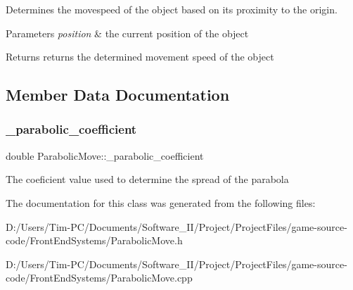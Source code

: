 Determines the movespeed of the object based on its proximity to the origin. 


\begin{DoxyParams}{Parameters}
{\em position} & the current position of the object \\
\hline
\end{DoxyParams}
\begin{DoxyReturn}{Returns}
returns the determined movement speed of the object 
\end{DoxyReturn}


\subsection{Member Data Documentation}
\mbox{\label{class_parabolic_move_a4ae7c298df76cb1a0f5f7d6f85c0977c}} 
\subsubsection{\texorpdfstring{\+\_\+parabolic\+\_\+coefficient}{\_parabolic\_coefficient}}
{\footnotesize\ttfamily double Parabolic\+Move\+::\+\_\+parabolic\+\_\+coefficient\hspace{0.3cm}{\ttfamily [private]}}

The coeficient value used to determine the spread of the parabola 

The documentation for this class was generated from the following files\+:\begin{DoxyCompactItemize}
\item 
D\+:/\+Users/\+Tim-\/\+P\+C/\+Documents/\+Software\+\_\+\+I\+I/\+Project/\+Project\+Files/game-\/source-\/code/\+Front\+End\+Systems/Parabolic\+Move.\+h\item 
D\+:/\+Users/\+Tim-\/\+P\+C/\+Documents/\+Software\+\_\+\+I\+I/\+Project/\+Project\+Files/game-\/source-\/code/\+Front\+End\+Systems/Parabolic\+Move.\+cpp\end{DoxyCompactItemize}
